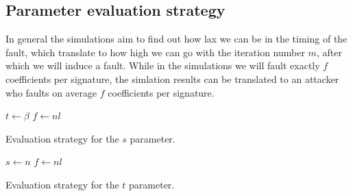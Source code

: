 \subsection{Parameter evaluation strategy}
In general the simulations aim to find out how lax we can be in the timing of the fault, which translate to how high we can go with the iteration number $m$, after which we will induce a fault. While in the simulations we will fault exactly $f$ coefficients per signature, the simlation results can be translated to an attacker who faults on average $f$ coefficients per signature.




    \begin{algorithm}
        $t \gets \beta$ 
        $f \gets nl$ 
        
        \caption{Evaluation strategy for the $s$ parameter.}
        \label{alg:surplus}
    \end{algorithm}
    
    \vspace{4em}
    
    \begin{algorithm}
        $s \gets n$ 
        $f \gets nl$ 
        
        \caption{Evaluation strategy for the $t$ parameter.}
        \label{alg:threshold}
    \end{algorithm}







